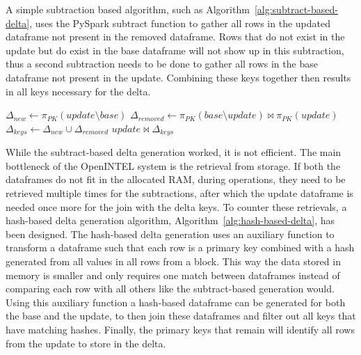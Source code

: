 A simple subtraction based algorithm, such as Algorithm~\ref{alg:subtract-based-delta}, uses the PySpark subtract function 
to gather all rows in the updated dataframe not present in the removed dataframe. Rows that do not exist in the update 
but do exist in the base dataframe will not show up in this subtraction, thus a second subtraction needs to be done 
to gather all rows in the base dataframe not present in the update. Combining these keys together 
then results in all keys necessary for the delta.

\begin{algorithm}
    \caption{Subtract-based Delta Generation}
    \label{alg:subtract-based-delta}
    \begin{algorithmic}[1]
            \State $\Delta_{new} \gets \pi_{PK}(update \setminus base)$
            \State $\Delta_{removed} \gets \pi_{PK}(base \setminus update) \bowtie \pi_{PK}(update)$
            \State $\Delta_{keys} \gets \Delta_{new} \cup \Delta_{removed}$
            \State \Return $update \bowtie \Delta_{keys}$
        \EndFunction
    \end{algorithmic}
\end{algorithm}
\vspace*{-1\baselineskip}

While the subtract-based delta generation worked, it is not efficient. The main bottleneck of the 
OpenINTEL system is the retrieval from storage. If both the dataframes do not fit in the allocated RAM,
during operations, they need to be retrieved multiple times for the subtractions, after which the update 
dataframe is needed once more for the join with the delta keys. To counter these retrievals, a hash-based 
delta generation algorithm, Algorithm~\ref{alg:hash-based-delta}, has been designed. The hash-based delta
generation uses an auxiliary function to transform a dataframe such that each row is a primary key combined 
with a hash generated from all values in all rows from a block. This way the data stored in memory is smaller 
and only requires one match between dataframes instead of comparing each row with all others like the 
subtract-based generation would. Using this auxiliary function a hash-based dataframe can be generated 
for both the base and the update, to then join these dataframes and filter out all keys that have matching 
hashes. Finally, the primary keys that remain will identify all rows from the update to store in the delta.

